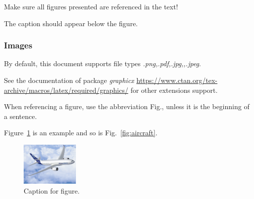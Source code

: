 Make sure all figures presented are referenced in the text!

The caption should appear below the figure.


\subsubsection{Images}
\label{subsection:images}

By default, this document supports file types {\it .png,.pdf,.jpg,,.jpeg}.

See the documentation of package {\it graphicx} \url{https://www.ctan.org/tex-archive/macros/latex/required/graphics/} for other extensions support.

When referencing a figure, use the abbreviation Fig., unless it is the beginning of a sentence.

Figure~\ref{fig:airbus1} is an example and so is Fig.~\ref{fig:aircraft}.

\begin{figure}[!htb]
  \centering
  \includegraphics[width=0.25\textwidth]{Figures/Airbus_A350.jpg}
  \caption[Optional caption for figure in TOC.]{Caption for figure.}
  \label{fig:airbus1}
\end{figure}

